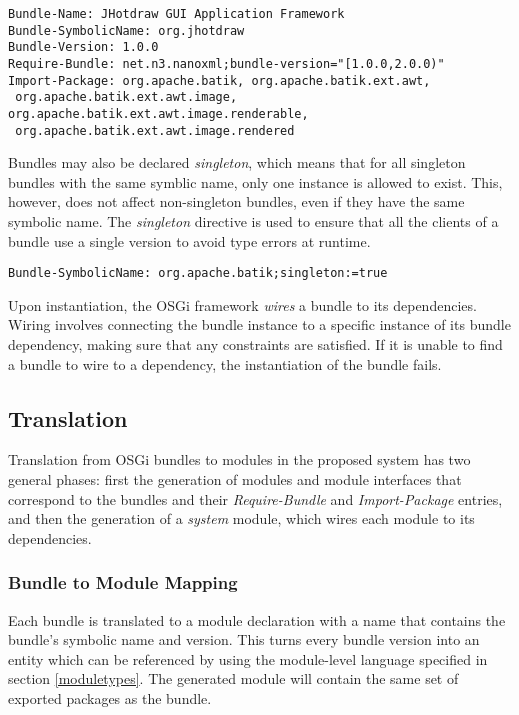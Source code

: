 \begin{lstlisting}[caption=Require-bundle and Import-package]
Bundle-Name: JHotdraw GUI Application Framework
Bundle-SymbolicName: org.jhotdraw
Bundle-Version: 1.0.0
Require-Bundle: net.n3.nanoxml;bundle-version="[1.0.0,2.0.0)"
Import-Package: org.apache.batik, org.apache.batik.ext.awt,
 org.apache.batik.ext.awt.image, org.apache.batik.ext.awt.image.renderable,
 org.apache.batik.ext.awt.image.rendered
\end{lstlisting}

Bundles may also be declared \textit{singleton}, which means that for all
singleton bundles with the same symblic name, only one instance is allowed to
exist. This, however, does not affect non-singleton bundles, even if they have
the same symbolic name. The \textit{singleton} directive is used to ensure that
all the clients of a bundle use a single version to avoid type errors at runtime.

\begin{lstlisting}[caption=Singleton Bundle]
Bundle-SymbolicName: org.apache.batik;singleton:=true
\end{lstlisting}

Upon instantiation, the OSGi framework \textit{wires} a bundle to its dependencies.
Wiring involves connecting the bundle instance to a specific instance of its bundle dependency, making
sure that any constraints are satisfied. If it is unable to find a bundle to wire to a
dependency, the instantiation of the bundle fails.

\subsection{Translation}

Translation from OSGi bundles to modules in the proposed system has two general phases:
first the generation of modules and module interfaces that correspond to the bundles and
their \textit{Require-Bundle} and \textit{Import-Package} entries, and then the generation of
a \textit{system} module, which wires each module to its dependencies.

\subsubsection{Bundle to Module Mapping}

Each bundle is translated to a module declaration with a name that contains the bundle's
symbolic name and version. This turns every bundle version into an entity which
can be referenced by using the module-level language specified in section \ref{moduletypes}.
The generated module will contain the same set of exported packages as the bundle.

